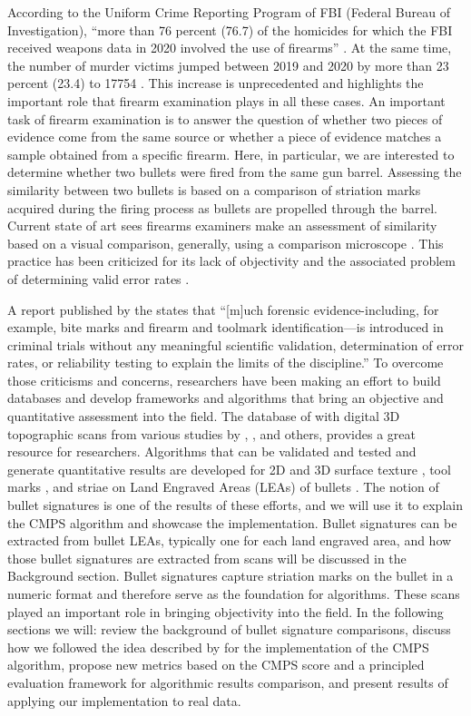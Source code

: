 According to the Uniform Crime Reporting Program of FBI (Federal Bureau
of Investigation), ``more than 76 percent (76.7) of the homicides for
which the FBI received weapons data in 2020 involved the use of
firearms'' \citep{fbiucr}. At the same time, the number of murder
victims jumped between 2019 and 2020 by more than 23 percent (23.4) to
17754 \citep{fbiucr20}. This increase is unprecedented and highlights
the important role that firearm examination plays in all these cases. An
important task of firearm examination is to answer the question of
whether two pieces of evidence come from the same source or whether a
piece of evidence matches a sample obtained from a specific firearm.
Here, in particular, we are interested to determine whether two bullets
were fired from the same gun barrel. Assessing the similarity between
two bullets is based on a comparison of striation marks acquired during
the firing process as bullets are propelled through the barrel. Current
state of art sees firearms examiners make an assessment of similarity
based on a visual comparison, generally, using a comparison microscope
\citep{afte}. This practice has been criticized for its lack of
objectivity and the associated problem of determining valid error rates
\citep{pcast}.

A report published by the \citet{nrc} states that ``{[}m{]}uch forensic
evidence-including, for example, bite marks and firearm and toolmark
identification---is introduced in criminal trials without any meaningful
scientific validation, determination of error rates, or reliability
testing to explain the limits of the discipline.'' To overcome those
criticisms and concerns, researchers have been making an effort to build
databases and develop frameworks and algorithms that bring an objective
and quantitative assessment into the field. The database of
\citet{nistdb} with digital 3D topographic scans from various studies by
\citet{brundage}, \citet{hamby}, \citet{Hamby:2019} and others, provides
a great resource for researchers. Algorithms that can be validated and
tested and generate quantitative results are developed for 2D and 3D
surface texture \citep{song2005}, tool marks
\citep{ChumbleyL_Scott2010VoTM}, and striae on Land Engraved Areas
(LEAs) of bullets \citep[\citet{pmid30444940}, \citet{cmps}]{aoas}. The
notion of bullet signatures is one of the results of these efforts, and
we will use it to explain the CMPS algorithm and showcase the
 implementation. Bullet signatures can be extracted from
bullet LEAs, typically one for each land engraved area, and how those
bullet signatures are extracted from scans will be discussed in the
Background section. Bullet signatures capture striation marks on the
bullet in a numeric format and therefore serve as the foundation for
algorithms. These scans played an important role in bringing objectivity
into the field. In the following sections we will: review the background
of bullet signature comparisons, discuss how we followed the idea
described by \citet{cmps} for the implementation of the CMPS algorithm,
propose new metrics based on the CMPS score and a principled evaluation
framework for algorithmic results comparison, and present results of
applying our implementation to real data.

